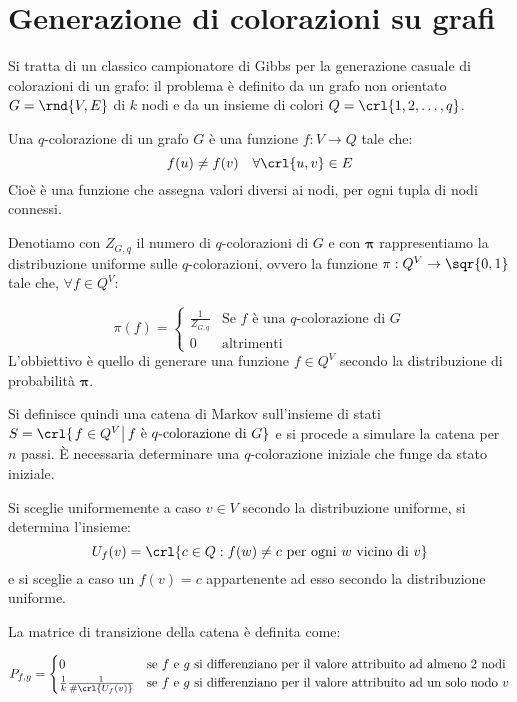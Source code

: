 \documentclass[\main/main.tex]{subfiles}
\begin{document}
\section{Generazione di colorazioni su grafi}
Si tratta di un classico campionatore di Gibbs per la generazione casuale di colorazioni di un grafo: il problema è definito da un grafo non orientato \(G = \rnd{V, E}\) di \(k\) nodi e da un insieme di colori \(Q = \crl{1, 2, \ldots, q}\).

\begin{definition}[\(q\)-colorazione]
  Una \(q\)-colorazione di un grafo \(G\) è una funzione \(f: V \rightarrow Q\) tale che:
  \[
    f(u) \neq f(v) \quad \forall \crl{u, v} \in E
  \]
  Cioè è una funzione che assegna valori diversi ai nodi, per ogni tupla di nodi connessi.
\end{definition}

Denotiamo con \(Z_{G, q}\) il numero di \(q\)-colorazioni di \(G\) e con \(\bm{\pi} \) rappresentiamo la distribuzione uniforme sulle \(q\)-colorazioni, ovvero la funzione \(\pi: Q^V \rightarrow \sqr{0,1}\) tale che, \(\forall f \in Q^V\):

\[
  \pi(f) = \begin{cases}
    \frac{1}{Z_{G, q}} & \text{Se \(f\) è una \(q\)-colorazione di \(G\)} \\
    0                  & \text{altrimenti}
  \end{cases}
\]
L'obbiettivo è quello di generare una funzione \(f \in Q^V\) secondo la distribuzione di probabilità \(\bm{\pi} \).

Si definisce quindi una catena di Markov sull'insieme di stati \(S = \crl{\left. f \in Q^V \right\rvert f \text{ è } q\text{-colorazione di }G}\) e si procede a simulare la catena per \(n\) passi. È necessaria determinare una \(q\)-colorazione iniziale che funge da stato iniziale.

Si sceglie uniformemente a caso \(v \in V\) secondo la distribuzione uniforme, si determina l'insieme:
\[
  U_{f}(v) = \crl{c \in Q: f(w)\neq c \text{ per ogni \(w\) vicino di \(v\)}}
\]
e si sceglie a caso un \(f(v) = c\) appartenente ad esso secondo la distribuzione uniforme.

La matrice di transizione della catena è definita come:

\[
  P_{f,g} = \begin{cases}
    0                                   & \text{se \(f\) e \(g\) si differenziano per il valore attribuito ad almeno 2 nodi}      \\
    \frac{1}{k}\frac{1}{\#\crl{U_f(v)}} & \text{se \(f\) e \(g\) si differenziano per il valore attribuito ad un solo nodo \(v\)}
  \end{cases}
\]
\end{document}
